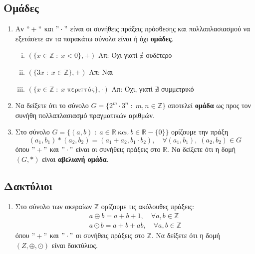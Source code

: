 \documentclass[a4paper,table]{report}
\begin{document}
\begin{center}
\textcolor{Col1}{}
\end{center}

\vspace{\baselineskip}

\subsection*{Ομάδες}

\begin{enumerate}
   \item Αν $ "+" $ και $ "\cdot" $ είναι οι συνήθεις πράξεις πρόσθεσης και
     πολλαπλασιασμού να εξετάσετε αν τα παρακάτω σύνολα είναι ή όχι \textbf{ομάδες}.
     \begin{enumerate}[i)]
       \item $ (\{ x \in \mathbb{Z} \; : \; x<0 \},+) $ \hfill Απ: Όχι γιατί $ \nexists
         $ ουδέτερο 
       \item $ (\{ 3x \; : \; x \in \mathbb{Z}\},+) $ \hfill Απ: Ναι 
       \item $ (\{ x \in \mathbb{Z} \; : \; x \; \text{περιττός}\},\cdot) $ \hfill Απ:
         Όχι, γιατί $ \nexists $ συμμετρικό 
     \end{enumerate}

  \item Να δείξετε ότι το σύνολο 
    $G = \{ 2^{m}\cdot 3^{n} \; : \; m,n \in \mathbb{Z} \}$ αποτελεί \textbf{ομάδα} 
    ως προς τον συνήθη πολλαπλασιασμό πραγματικών αριθμών.

  \item Στο σύνολο $ G = \{ (a,b) \; : \; a \in \mathbb{R} \; \text{και} \; b \in
    \mathbb{R} - \{ 0 \} \} $ ορίζουμε την πράξη 
    \[
      (a_{1}, b_{1}) * (a_{2}, b_{2}) = (a_{1}+ a_{2}, b_{1} \cdot b_{2}), \quad \forall
      (a_{1}, b_{1}), \; (a_{2}, b_{2}) \in G
     \] 
     όπου $ "+" $ και $ "\cdot" $ είναι οι συνήθεις πράξεις στο $ \mathbb{R} $. 
     Να δείξετε ότι η δομή $ (G, *) $ είναι \textbf{αβελιανή ομάδα}.
\end{enumerate}

\subsection*{Δακτύλιοι}

\begin{enumerate}
  \item Στο σύνολο των ακεραίων $ \mathbb{Z} $ ορίζουμε τις ακόλουθες πράξεις: 
    \begin{gather*}
      a \oplus b = a+b+1, \quad \forall a,b \in \mathbb{Z} \\
      a \odot b = a+b+ab, \quad \forall a,b \in \mathbb{Z}
    \end{gather*} 
    όπου $ "+" $ και $ "\cdot" $ οι συνήθεις πράξεις στο $ \mathbb{Z} $. Να δείξετε ότι 
    η δομή $ (Z, \oplus , \odot) $ είναι δακτύλιος.
\end{enumerate}
\end{document}
